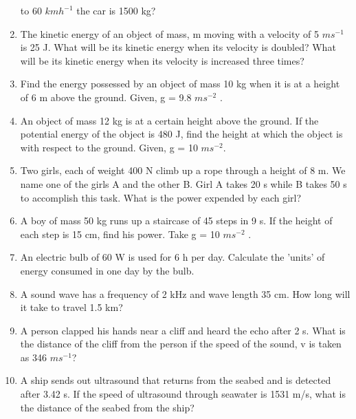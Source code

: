 \begin{enumerate}[label=\arabic*.,ref=\thesection.\theenumi]
to 60 $km h^{-1}$ the car is 1500 kg? 
\item The kinetic energy of an object of mass, m moving with a velocity of 5 $m s^{-1}$
is 25 J. What will be its
kinetic energy when its velocity is doubled? What will be its kinetic energy when its velocity is increased three times?
\item  Find the energy possessed by an object of mass 10 kg when it is at a height of 6 m above the ground. Given, g = 9.8 $m s^{-2}$
.
\item An object of mass 12 kg is at a certain height above the ground. If the potential energy of the object is 480 J, find the height at which the object is with respect to the ground. Given, g = 10 $m s^{-2}$.
\item Two girls, each of weight 400 N climb up a rope through a height of 8 m. We name one of the girls A and the other B. Girl A takes 20 s while B takes 50 s to accomplish this task. What is the power expended by each girl?
\item A boy of mass 50 kg runs up a staircase of 45 steps in 9 s. If the height of each step is 15 cm, find his power. Take g = 10 $m s^{-2}$
.
\item An electric bulb of 60 W is used for 6 h per day. Calculate the 'units' of energy consumed in one day by the bulb.
\item A sound wave has a frequency of 2 kHz and wave length 35 cm. How long will it take to travel 1.5 km?
\item A person clapped his hands near a cliff and heard the echo after 2 s. What is the distance of the cliff from the person if the speed of the sound, v is taken as 346 $m s^{-1}$?
\item A ship sends out ultrasound that returns from the seabed and is
detected after 3.42 s. If the speed of ultrasound through seawater is 1531 m/s, what is the distance of the seabed from the ship?
\end{enumerate}
